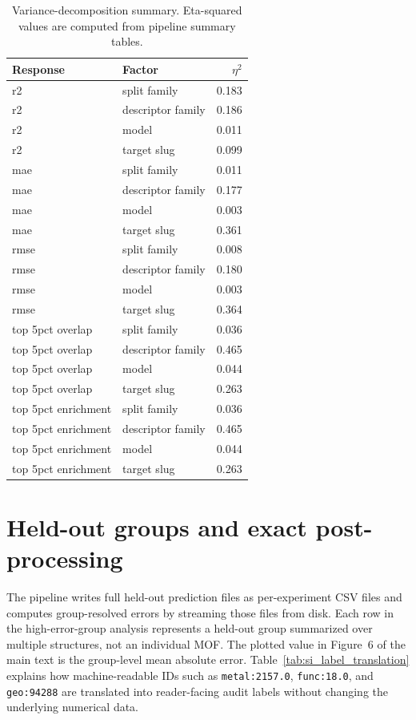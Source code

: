 \documentclass[11pt,a4paper]{article}
\begin{document}
\begin{table}[H]
\centering
\caption{Variance-decomposition summary. Eta-squared values are computed from pipeline summary tables.}
\label{tab:si_variance}
\small
\begin{tabular}{llr}
\toprule
Response & Factor & $\eta^2$ \\
\midrule
r2 & split family & 0.183 \\
r2 & descriptor family & 0.186 \\
r2 & model & 0.011 \\
r2 & target slug & 0.099 \\
mae & split family & 0.011 \\
mae & descriptor family & 0.177 \\
mae & model & 0.003 \\
mae & target slug & 0.361 \\
rmse & split family & 0.008 \\
rmse & descriptor family & 0.180 \\
rmse & model & 0.003 \\
rmse & target slug & 0.364 \\
top 5pct overlap & split family & 0.036 \\
top 5pct overlap & descriptor family & 0.465 \\
top 5pct overlap & model & 0.044 \\
top 5pct overlap & target slug & 0.263 \\
top 5pct enrichment & split family & 0.036 \\
top 5pct enrichment & descriptor family & 0.465 \\
top 5pct enrichment & model & 0.044 \\
top 5pct enrichment & target slug & 0.263 \\
\bottomrule
\end{tabular}
\end{table}


\section{Held-out groups and exact post-processing}
The pipeline writes full held-out prediction files as per-experiment CSV files and computes group-resolved
errors by streaming those files from disk. Each row in the high-error-group analysis represents a held-out
group summarized over multiple structures, not an individual MOF. The plotted value in Figure~6 of the
main text is the group-level mean absolute error. Table~\ref{tab:si_label_translation} explains how
machine-readable IDs such as \texttt{metal:2157.0}, \texttt{func:18.0}, and \texttt{geo:94288} are translated
into reader-facing audit labels without changing the underlying numerical data.
\end{document}
